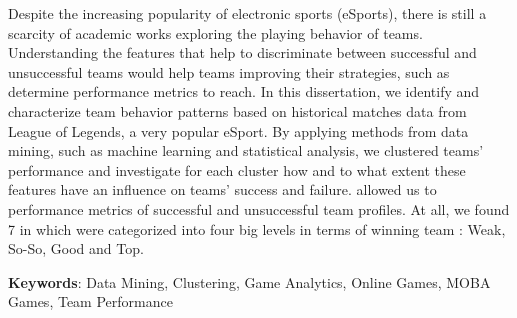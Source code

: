 Despite the increasing popularity of electronic sports (eSports), there is still a scarcity of academic works exploring the playing behavior of teams. Understanding the features that help to discriminate between successful and unsuccessful teams would help teams improving their strategies, such as determine performance metrics to reach. In this dissertation, we identify and characterize team behavior patterns based on historical matches data from League of Legends, a very popular eSport. By applying methods from data mining, such as machine learning and statistical analysis, we clustered teams' performance and investigate for each cluster how and to what extent these features have an influence on teams' success and failure.  allowed us to  performance metrics of successful and unsuccessful team profiles. At all, we found 7  in which were categorized into four big levels in terms of winning team : Weak, So-So, Good and Top.

\textbf{Keywords}: Data Mining, Clustering, Game Analytics, Online Games, MOBA Games, Team Performance